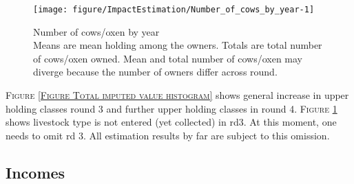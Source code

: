 \begin{Schunk}
\begin{figure}

{\centering \texttt{[image: figure/ImpactEstimation/Number\_of\_cows\_by\_year-1]} 

}

\caption{Number of cows/oxen by year\\ {\footnotesize Means are mean holding among the owners. Totals are total number of cows/oxen owned. Mean and total number of cows/oxen may diverge because the number of owners differ across round.\setlength{\baselineskip}{8pt}}}\label{Figure Number of cows by year}
\end{figure}
\end{Schunk}
\begin{palepinkleftbar}
\begin{finding}
\textsc{\small Figure \ref{Figure Total imputed value histogram}} shows general increase in upper holding classes round 3 and further upper holding classes in round 4. \textsc{\small Figure \ref{Figure Number of cows by year}} shows livestock type is not entered (yet collected) in rd3. At this moment, one needs to omit rd 3. All estimation results by far are subject to this omission.
\end{finding}
\end{palepinkleftbar}

\clearpage
\subsection{Incomes}



